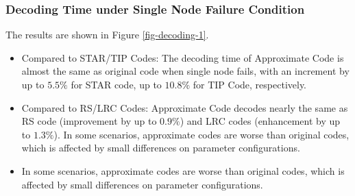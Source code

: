\documentclass[sigconf]{acmart}
\begin{document}
\subsubsection{Decoding Time under Single Node Failure Condition}
The results are shown in Figure \ref{fig-decoding-1}.
\begin{itemize}
    \item Compared to STAR/TIP Codes: The decoding time of Approximate Code is almost the same as original code when single node fails, with an increment by up to $5.5\%$ for STAR code, up to $10.8\%$ for TIP Code, respectively.
    \item Compared to RS/LRC Codes: Approximate Code decodes nearly the same as RS code (improvement by up to $0.9\%$) and LRC codes (enhancement by up to $1.3\%$). In some scenarios, approximate codes are worse than original codes, which is affected by small differences on parameter configurations.
    \item In some scenarios, approximate codes are worse than original codes, which is affected by small differences on parameter configurations.
\end{itemize}

\end{document}
